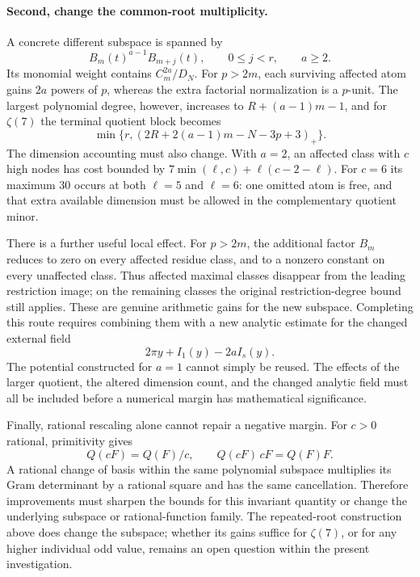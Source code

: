 \documentclass[11pt,letterpaper]{article}
\theoremstyle{definition}
\newcommand{\pos}[1]{\left(#1\right)_{+}}
\begin{document}
\paragraph{Second, change the common-root multiplicity.}
A concrete different subspace is spanned by
\begin{equation}\label{eq:higher-powered-window}
 B_m(t)^{a-1}B_{m+j}(t),\qquad 0\le j<r,\qquad a\ge2.
\end{equation}
Its monomial weight contains $C_m^{2a}/D_N$. For $p>2m$, each
surviving affected atom gains $2a$ powers of $p$, whereas the extra
factorial normalization is a $p$-unit. The largest polynomial degree,
however, increases to $R+(a-1)m-1$, and for $\zeta(7)$ the terminal
quotient block becomes
\[
 \min\{r,\pos{2R+2(a-1)m-N-3p+3}\}.
\]
The dimension accounting must also change. With $a=2$, an affected
class with $c$ high nodes has cost bounded by
$7\min(\ell,c)+\ell(c-2-\ell)$.
For $c=6$ its maximum $30$ occurs at both $\ell=5$ and $\ell=6$:
one omitted atom is free, and that extra available dimension must
be allowed in the complementary quotient minor.

There is a further useful local effect. For $p>2m$, the additional
factor $B_m$ reduces to zero on every affected residue class, and
to a nonzero constant on every unaffected class. Thus affected
maximal classes disappear from the leading restriction image;
on the remaining classes the original restriction-degree bound
still applies. These are genuine arithmetic gains for the new
subspace. Completing this route requires combining them with a
new analytic estimate for the changed external field
\[
 2\pi y+I_1(y)-2aI_s(y).
\]
The potential constructed for $a=1$ cannot simply be reused.
The effects of the larger quotient, the altered dimension count,
and the changed analytic field must all be included before a
numerical margin has mathematical significance.

Finally, rational rescaling alone cannot repair a negative margin.
For $c>0$ rational, primitivity gives
\[
 Q(cF)=Q(F)/c,\qquad Q(cF)\,cF=Q(F)F.
\]
A rational change of basis within the same polynomial subspace
multiplies its Gram determinant by a rational square and has the
same cancellation. Therefore improvements must sharpen the bounds
for this invariant quantity or change the underlying subspace or
rational-function family. The repeated-root construction above
does change the subspace; whether its gains suffice for $\zeta(7)$,
or for any higher individual odd value, remains an open question
within the present investigation.
\end{document}
